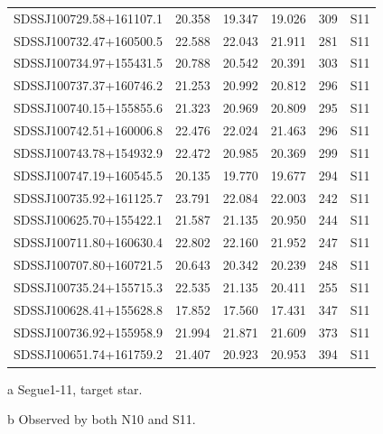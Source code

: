 \documentclass[manuscript]{aastex}
\begin{document}
\begin{table}
\begin{threeparttable}
\begin{center}
{\begin{tabular}{c c c c c c}
     SDSSJ100729.58+161107.1         & 20.358   & 19.347   & 19.026     &  309  & S11     \\     
     SDSSJ100732.47+160500.5         & 22.588   & 22.043   & 21.911     &  281	& S11     \\
     SDSSJ100734.97+155431.5         & 20.788   & 20.542   & 20.391     &  303	& S11     \\
     SDSSJ100737.37+160746.2         & 21.253   & 20.992   & 20.812     &  296	& S11     \\
     SDSSJ100740.15+155855.6         & 21.323   & 20.969   & 20.809     &  295	& S11     \\
     SDSSJ100742.51+160006.8         & 22.476   & 22.024   & 21.463     &  296	& S11     \\
     SDSSJ100743.78+154932.9         & 22.472   & 20.985   & 20.369     &  299	& S11     \\
     SDSSJ100747.19+160545.5         & 20.135   & 19.770   & 19.677     &  294	& S11     \\ 
     SDSSJ100735.92+161125.7         & 23.791   & 22.084   & 22.003    &  242  & S11     \\
     SDSSJ100625.70+155422.1         & 21.587   & 21.135   & 20.950    &  244	& S11     \\
     SDSSJ100711.80+160630.4         & 22.802   & 22.160   & 21.952    &  247	& S11     \\
     SDSSJ100707.80+160721.5         & 20.643   & 20.342   & 20.239    &  248	& S11     \\
     SDSSJ100735.24+155715.3         & 22.535   & 21.135   & 20.411    &  255	& S11     \\
     SDSSJ100628.41+155628.8         & 17.852   & 17.560   & 17.431    &  347	& S11     \\
     SDSSJ100736.92+155958.9         & 21.994   & 21.871   & 21.609    &  373	& S11     \\
     SDSSJ100651.74+161759.2         & 21.407   & 20.923   & 20.953    &  394	& S11     \\ \hline
										          
     \end{tabular} }
     \begin{tablenotes}
       \item[a]{{\tiny Segue1-11, target star.}}
       \item[b]{{\tiny Observed by both N10 and S11.}}
      \end{tablenotes}
     \end{center}
   \end{threeparttable}
\end{table}
\end{document}
